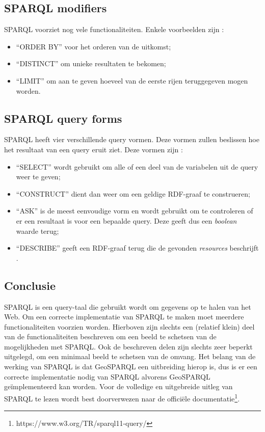 \subsection{SPARQL modifiers}
SPARQL voorziet nog vele functionaliteiten. Enkele voorbeelden zijn \cite{sparql2013querylanguage}:
\begin{itemize}
    \item ``ORDER BY'' voor het orderen van de uitkomst;
    \item ``DISTINCT'' om unieke resultaten te bekomen;
    \item ``LIMIT'' om aan te geven hoeveel van de eerste rijen teruggegeven mogen worden.
\end{itemize}

\subsection{SPARQL query forms}
SPARQL heeft vier verschillende query vormen. Deze vormen zullen beslissen hoe het resultaat van een query eruit ziet. Deze vormen zijn \cite{sparql2013querylanguage}:
\begin{itemize}
    \item ``SELECT'' wordt gebruikt om alle of een deel van de variabelen uit de query weer te geven;
    \item ``CONSTRUCT'' dient dan weer om een geldige RDF-graaf te construeren;
    \item ``ASK'' is de meest eenvoudige vorm en wordt gebruikt om te controleren of er een resultaat is voor een bepaalde query. Deze geeft dus een \textit{boolean} waarde terug;
    \item ``DESCRIBE'' geeft een RDF-graaf terug die de gevonden \textit{resources} beschrijft .
\end{itemize}

\subsection{Conclusie}
SPARQL is een query-taal die gebruikt wordt om gegevens op te halen van het Web. Om een correcte implementatie van SPARQL te maken moet meerdere functionaliteiten voorzien worden. Hierboven zijn slechts een (relatief klein) deel van de functionaliteiten beschreven om een beeld te schetsen van de mogelijkheden met SPARQL. Ook de beschreven delen zijn slechts zeer beperkt uitgelegd, om een minimaal beeld te schetsen van de omvang. Het belang van de werking van SPARQL is dat GeoSPARQL een uitbreiding hierop is, dus is er een correcte implementatie nodig van SPARQL alvorens GeoSPARQL geïmplementeerd kan worden. Voor de volledige en uitgebreide uitleg van SPARQL te lezen wordt best doorverwezen naar de officiële documentatie\footnote{https://www.w3.org/TR/sparql11-query/}.